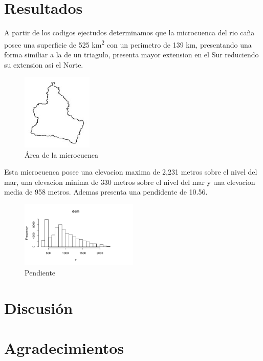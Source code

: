 \documentclass[11pt,]{article}
\begin{document}
\section{Resultados}\label{resultados}

A partir de los codigos ejectudos determinamos que la microcuenca del
rio caña posee una superficie de 525 km\textsuperscript{2} con un
perimetro de 139 km, presentando una forma similiar a la de un triagulo,
presenta mayor extension en el Sur reduciendo su extension asi el Norte.

\begin{figure}
\centering
\includegraphics[width=0.30000\textwidth]{area_cana.jpg}
\caption{Área de la microcuenca}
\end{figure}

Esta microcuenca posee una elevacion maxima de 2,231 metros sobre el
nivel del mar, una elevacion minima de 330 metros sobre el nivel del mar
y una elevacion media de 958 metros. Ademas presenta una pendidente de
10.56.

\begin{figure}
\centering
\includegraphics[width=0.50000\textwidth]{pendiente_cana.png}
\caption{Pendiente}
\end{figure}

\section{Discusión}\label{discusiuxf3n}

\section{Agradecimientos}\label{agradecimientos}
\end{document}
